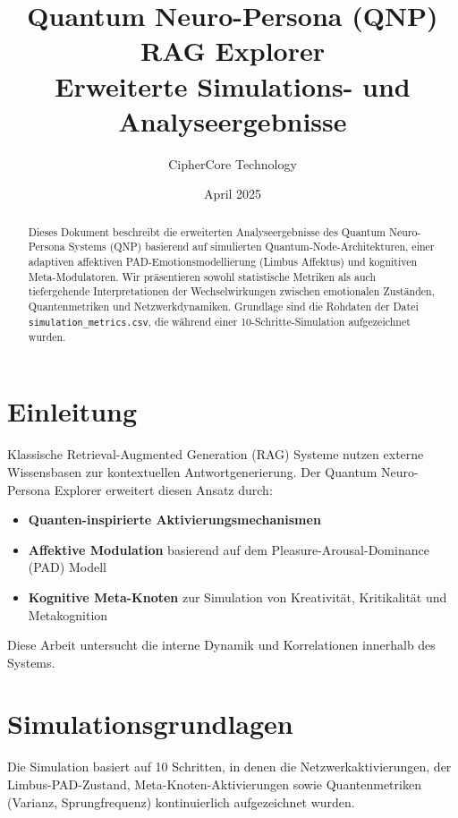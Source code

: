 \documentclass[11pt,a4paper]{article}
\title{Quantum Neuro-Persona (QNP) RAG Explorer \\ \Large Erweiterte Simulations- und Analyseergebnisse}
\author{CipherCore Technology}
\date{April 2025}
\begin{document}
\maketitle
\thispagestyle{empty}

\begin{abstract}
\noindent
Dieses Dokument beschreibt die erweiterten Analyseergebnisse des Quantum Neuro-Persona Systems (QNP) basierend auf simulierten Quantum-Node-Architekturen, einer adaptiven affektiven PAD-Emotionsmodellierung (Limbus Affektus) und kognitiven Meta-Modulatoren. 
Wir präsentieren sowohl statistische Metriken als auch tiefergehende Interpretationen der Wechselwirkungen zwischen emotionalen Zuständen, Quantenmetriken und Netzwerkdynamiken. Grundlage sind die Rohdaten der Datei \texttt{simulation\_metrics.csv}, die während einer 10-Schritte-Simulation aufgezeichnet wurden.
\end{abstract}

\section{Einleitung}
\label{sec:intro}

Klassische Retrieval-Augmented Generation (RAG) Systeme \cite{lewis2020retrieval} nutzen externe Wissensbasen zur kontextuellen Antwortgenerierung. Der Quantum Neuro-Persona Explorer erweitert diesen Ansatz durch:
\begin{itemize}
    \item \textbf{Quanten-inspirierte Aktivierungsmechanismen} \cite{schuld2014quest}
    \item \textbf{Affektive Modulation} basierend auf dem Pleasure-Arousal-Dominance (PAD) Modell \cite{mehrabian1996pleasure}
    \item \textbf{Kognitive Meta-Knoten} zur Simulation von Kreativität, Kritikalität und Metakognition \cite{cox2005metacognition}
\end{itemize}
Diese Arbeit untersucht die interne Dynamik und Korrelationen innerhalb des Systems.

\section{Simulationsgrundlagen}
\label{sec:simbasics}

Die Simulation basiert auf 10 Schritten, in denen die Netzwerkaktivierungen, der Limbus-PAD-Zustand, Meta-Knoten-Aktivierungen sowie Quantenmetriken (Varianz, Sprungfrequenz) kontinuierlich aufgezeichnet wurden.
\end{document}
